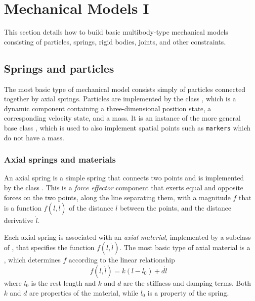
\section{Mechanical Models I}
\label{MechModelsI:sec}

This section details how to build basic multibody-type mechanical
models consisting of particles, springs, rigid bodies, joints, and
other constraints.

\subsection{Springs and particles}
\label{ParticlesAndSprings:sec}

The most basic type of mechanical model consists simply of particles
connected together by axial springs.  Particles are implemented by the
class , which is a
dynamic component containing a three-dimensional position state, a
corresponding velocity state, and a mass. It is an instance of the
more general base class ,
which is used to also implement spatial points such as {\tt markers}
which do not have a mass.

\subsubsection{Axial springs and materials}

An axial spring is a simple spring that connects two points and is
implemented by the class
. This is a {\it
force effector} component that exerts equal and opposite forces on the
two points, along the line separating them, with a magnitude $f$ that
is a function $f(l, \dot l)$ of the distance $l$ between the points,
and the distance derivative $\dot l$.

Each axial spring is associated with an {\it axial material},
implemented by a subclass of
, that specifies
the function $f(l, \dot l)$. The most basic type of axial material is
a , which
determines $f$ according to the linear relationship
%
\begin{equation}
f(l, \dot l) = k (l-l_0) + d \dot l
\end{equation}
%
where $l_0$ is the rest length and $k$ and $d$ are the stiffness and
damping terms. Both $k$ and $d$ are properties of the material, while
$l_0$ is a property of the spring.

